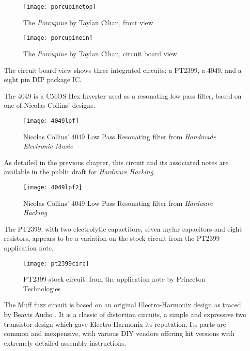 	\citep{cihan2015}

	\begin{figure}[H]
	  \caption{The \emph{Porcupine} by Taylan Cihan, front view}
	  \centering
	    \texttt{[image: porcupinetop]}
	\end{figure}
	
	\begin{figure}[H]
	  \caption{The \emph{Porcupine} by Taylan Cihan, circuit board view}
	  \centering
	    \texttt{[image: porcupinein]}
	\end{figure}
	
The circuit board view shows three integrated circuits: a PT2399, a 4049, and a eight pin DIP package IC.

The 4049 is a CMOS Hex Inverter used as a resonating low pass filter, based on one of Nicolas Collins' designs.

	\begin{figure}[H]
	  \caption{Nicolas Collins' 4049 Low Pass Resonating filter from \emph{Handmade Electronic Music}}
	  \centering
	    \texttt{[image: 4049lpf]}
	\end{figure} 
	
As detailed in the previous chapter, this circuit and its associated notes are available in the public draft for \emph{Hardware Hacking}. 

	\begin{figure}[H]
	  \caption{Nicolas Collins' 4049 Low Pass Resonating filter from \emph{Hardware Hacking}}
	  \centering
	    \texttt{[image: 4049lpf2]}
	\end{figure} 

The PT2399, with two electrolytic capactitors, seven mylar capacitors and eight resistors, appears to be a variation on the stock circuit from the PT2399 application note.

	\begin{figure}[H]
	  \caption{PT2399 stock circuit, from the application note by Princeton Technologies}
	  \centering
	    \texttt{[image: pt2399circ]}
	\end{figure}
	
The Muff fuzz circuit is based on an original Electro-Harmonix design as traced by Beavis Audio \citep{beavis2015b} . It is a classic of distortion circuits, a simple and expressive two transistor design which gave Electro Harmonix its reputation. Its parts are common and inexpensive, with various DIY vendors offering kit versions with extremely detailed assembly instructions.

